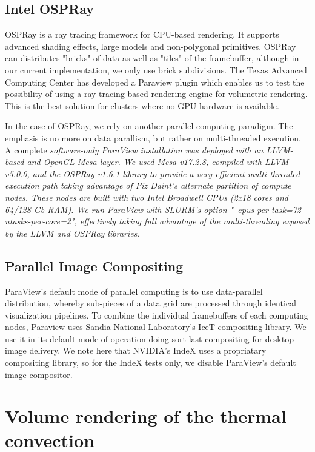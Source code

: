 \documentclass[final,5p,times,twocolumn]{elsarticle}
\begin{document}
\subsection{Intel OSPRay}

OSPRay\cite{OSPRay} is a ray tracing framework for CPU-based rendering. It supports advanced 
shading effects, large models and non-polygonal primitives. OSPRay can distributes 
"bricks" of data as well as "tiles" of the framebuffer, although in our current
implementation, we only use brick subdivisions. The Texas Advanced Computing Center
has developed a Paraview plugin which enables us to test the possibility of
using a ray-tracing based rendering engine for volumetric rendering. This is
the best solution for clusters where no GPU hardware is available.

In the case of OSPRay, we rely on another parallel computing paradigm.
The emphasis is no more on data parallism, but rather on multi-threaded execution.
A complete \it{software-only} \rm ParaView installation was deployed with an LLVM-based and
OpenGL Mesa layer. We used Mesa v17.2.8, compiled with LLVM v5.0.0, and the
OSPRay v1.6.1 library to provide a very efficient multi-threaded execution path
taking advantage of Piz Daint's alternate partition of compute nodes. These nodes
are built with two Intel Broadwell CPUs (2x18 cores and 64/128 Gb RAM). We run
ParaView with SLURM's option "--cpus-per-task=72 --ntasks-per-core=2", effectively
taking full advantage of the multi-threading exposed by the LLVM and OSPRay libraries. 

\subsection{Parallel Image Compositing}

ParaView's default mode of parallel computing is to use data-parallel distribution,
whereby sub-pieces of a data grid are processed through identical visualization
pipelines. To combine the individual framebuffers of each computing nodes,
Paraview uses Sandia National Laboratory's IceT\cite{Moreland2011} compositing
library. We use it in its default mode of operation doing sort-last compositing
for desktop image delivery. We note here that NVIDIA's IndeX uses a propriatary
compositing library, so for the IndeX tests only, we disable ParaView's default
image compositor.

\section{Volume rendering of the thermal convection}
\end{document}
